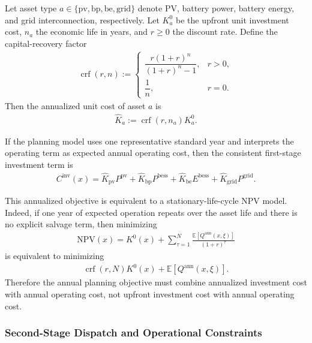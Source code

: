 Let asset type \(a\in\{\mathrm{pv},\mathrm{bp},\mathrm{be},\mathrm{grid}\}\) denote PV, battery power, battery energy, and grid interconnection, respectively. Let \(K_a^0\) be the upfront unit investment cost, \(n_a\) the economic life in years, and \(r\ge 0\) the discount rate. Define the capital-recovery factor
\begin{align}
\operatorname{crf}(r,n) :=
\begin{cases}
\dfrac{r(1+r)^n}{(1+r)^n-1}, & r>0,\\
\dfrac{1}{n}, & r=0.
\end{cases}
\label{eq:10a-crf}
\end{align}
Then the annualized unit cost of asset \(a\) is
\begin{align}
\widehat K_a := \operatorname{crf}(r,n_a) K_a^0.
\label{eq:10a-annualized-unit-capex}
\end{align}

If the planning model uses one representative standard year and interprets the operating term as expected annual operating cost, then the consistent first-stage investment term is
\begin{align}
C^{\mathrm{inv}}(x)
= \widehat K_{\mathrm{pv}} P^{\mathrm{pv}}
+ \widehat K_{\mathrm{bp}} P^{\mathrm{bess}}
+ \widehat K_{\mathrm{be}} E^{\mathrm{bess}}
+ \widehat K_{\mathrm{grid}} P^{\mathrm{grid}}.
\label{eq:10a-annualized-investment-cost}
\end{align}

This annualized objective is equivalent to a stationary-life-cycle NPV model. Indeed, if one year of expected operation repeats over the asset life and there is no explicit salvage term, then minimizing
\begin{align}
\mathrm{NPV}(x)
= K^0(x) + \sum_{\tau=1}^{N} \frac{\mathbb{E}[Q^{\mathrm{ann}}(x,\xi)]}{(1+r)^\tau}
\label{eq:10a-npv-life-cycle}
\end{align}
is equivalent to minimizing
\begin{align}
\operatorname{crf}(r,N) K^0(x) + \mathbb{E}[Q^{\mathrm{ann}}(x,\xi)].
\label{eq:10a-eac-equivalent}
\end{align}
Therefore the annual planning objective must combine annualized investment cost with annual operating cost, not upfront investment cost with annual operating cost.

\subsubsection{Second-Stage Dispatch and Operational Constraints}

